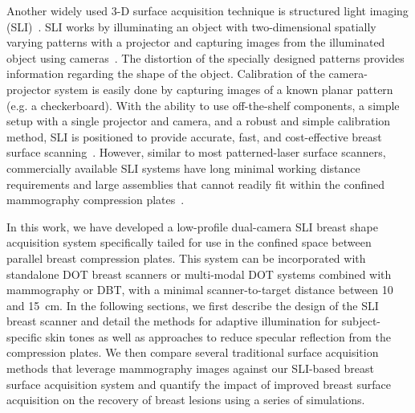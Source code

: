 Another widely used 3-D surface acquisition technique is structured light imaging (SLI)~\cite{Yang2020, Zhang2018}. SLI works by illuminating an object with two-dimensional spatially varying patterns with a projector and capturing images from the illuminated object using cameras~\cite{Geng2011}. The distortion of the specially designed patterns provides information regarding the shape of the object. Calibration of the camera-projector system is easily done by capturing images of a known planar pattern (e.g. a checkerboard). With the ability to use off-the-shelf components, a simple setup with a single projector and camera, and a robust and simple calibration method, SLI is positioned to provide accurate, fast, and cost-effective breast surface scanning~\cite{Yang2020}. However, similar to most patterned-laser surface scanners, commercially available SLI systems have long minimal working distance requirements and large assemblies that cannot readily fit within the confined mammography compression plates~\cite{Zhang2018, Rodriguez2017}.

In this work, we have developed a low-profile dual-camera SLI breast shape acquisition system specifically tailed for use in the confined space between parallel breast compression plates. This system can be incorporated with standalone DOT breast scanners or multi-modal DOT systems combined with mammography or DBT, with a minimal scanner-to-target distance between 10 and 15~cm. In the following sections, we first describe the design of the SLI breast scanner and detail the methods for adaptive illumination for subject-specific skin tones as well as approaches to reduce specular reflection from the compression plates. We then compare several traditional surface acquisition methods that leverage mammography images against our SLI-based breast surface acquisition system and quantify the impact of improved breast surface acquisition on the recovery of breast lesions using a series of simulations.



